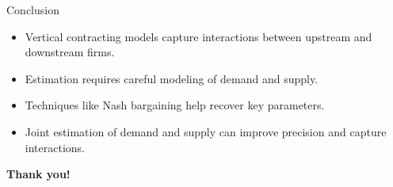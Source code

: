 \documentclass[aspectratio=169]{beamer}  %
\begin{document}
\begin{frame}{Conclusion}
    \begin{itemize}
        \item Vertical contracting models capture interactions between upstream and downstream firms.
        \item Estimation requires careful modeling of demand and supply.
        \item Techniques like Nash bargaining help recover key parameters.
        \item Joint estimation of demand and supply can improve precision and capture interactions.
    \end{itemize}

    \vspace{0.5cm}
    \begin{center}
        \textbf{Thank you!}
    \end{center}
\end{frame}
\end{document}
